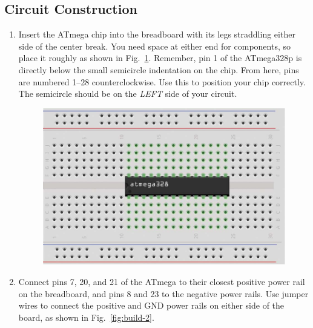 \documentclass[11pt]{article}
\begin{document}
\subsection{Circuit Construction}
\begin{enumerate}


\item {Insert the ATmega chip into the breadboard with its legs straddling
    either side of the center break. You need space at either end for components, so
    place it roughly as shown in Fig.~\ref{fig:build-1}.  Remember, pin 1 of the
    ATmega328p is directly below the small semicircle indentation on the chip. From
    here, pins are numbered 1--28 counterclockwise. Use this to position your chip
    correctly.  The semicircle should be on the \emph{LEFT} side of your circuit.}

  \begin{figure}[H]
    \centering
    \includegraphics[width=.7\linewidth]{figures/build-1.png}
    \caption{\label{fig:build-1}}
  \end{figure}

\item {Connect pins 7, 20, and 21 of the ATmega to their closest positive power rail
    on the breadboard, and pins 8 and 23 to the negative power rails. Use jumper
    wires to connect the positive and GND power rails on either side of the board, as
    shown in Fig.~\ref{fig:build-2}.}


\end{enumerate}
\end{document}
